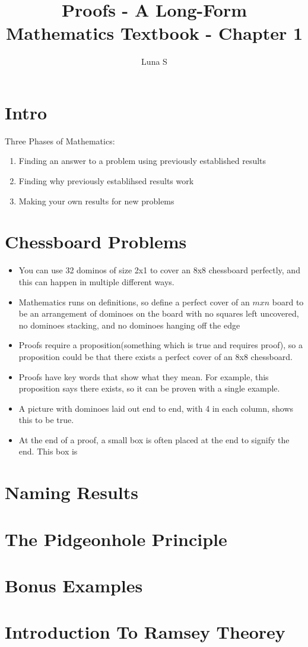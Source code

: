 \documentclass{article}
\author{Luna S}
\title{Proofs - A Long-Form Mathematics Textbook - Chapter 1}
\begin{document}
\maketitle
\tableofcontents

\section{Intro}
Three Phases of Mathematics:
\begin{enumerate}
    \item Finding an answer to a problem using previously established results
    \item Finding why previously establihsed results work
    \item Making your own results for new problems
\end{enumerate}

\section{Chessboard Problems}

\begin{itemize}
    \item You can use 32 dominos of size 2x1 to cover an 8x8 chessboard perfectly, and this can happen in multiple different ways.
    \item Mathematics runs on definitions, so define a perfect cover of an $m x n$ board to be an arrangement of dominoes on the board with no squares left uncovered, no dominoes stacking, and no dominoes hanging off the edge
    \item Proofs require a proposition(something which is true and requires proof), so a proposition could be that there exists a perfect cover of an 8x8 chessboard.
    \item Proofs have key words that show what they mean. For example, this proposition says there exists, so it can be proven with a single example.
    \item A picture with dominoes laid out end to end, with 4 in each column, shows this to be true.
    \item At the end of a proof, a small box is often placed at the end to signify the end. This box is \qedsymbol
\end{itemize}

\section{Naming Results}

\section{The Pidgeonhole Principle}

\section{Bonus Examples}

\section{Introduction To Ramsey Theorey}
\end{document}
